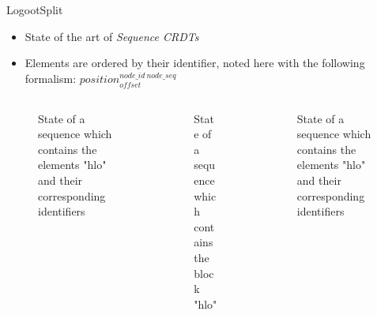 \documentclass[10pt]{beamer}
\newcommand{\trm}[1]{\mathit{#1}}
\newcommand{\id}[3]{$\trm{#1}^{\trm{#2}}_{\trm{#3}}$}
\newcommand{\widthletter}{7mm}
\begin{document}
\begin{frame}{LogootSplit }
  \begin{itemize}
    \item State of the art of \emph{Sequence \acp{CRDT}}
    \item Elements are ordered by their identifier, noted here with the following formalism: \id{position}{node\_id~node\_seq}{offset}
  \end{itemize}

  \pause

  \begin{columns}
    \begin{column}{0.33\textwidth}
      \begin{figure}
        \centering
        \caption{State of a sequence which contains the elements "hlo" and their corresponding identifiers}
      \end{figure}
    \end{column}
    \pause
    \begin{column}{0.33\textwidth}
      \vspace{-9mm}
      \begin{figure}
        \centering
        \caption{State of a sequence which contains the block "hlo"}
      \end{figure}
    \end{column}
    \pause
    \begin{column}{0.33\textwidth}
      \begin{figure}
        \vspace{-7mm}
        \centering
        \caption{State of a sequence which contains the elements "hlo" and their corresponding identifiers}
      \end{figure}
    \end{column}
  \end{columns}
\end{frame}
\end{document}
